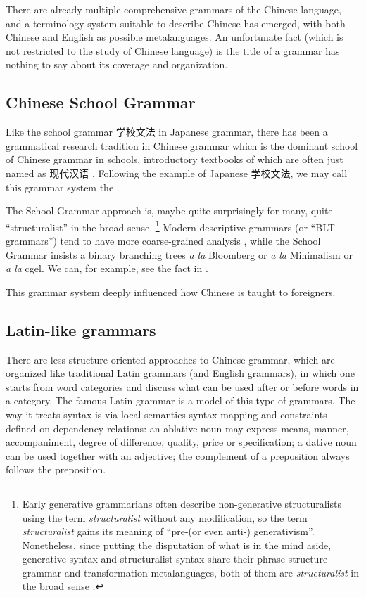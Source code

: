There are already multiple comprehensive grammars of the Chinese language, and a terminology system 
suitable to describe Chinese has emerged, with both Chinese and English as possible metalanguages. 
An unfortunate fact (which is not restricted to the study of Chinese language) is the title of a grammar
has nothing to say about its coverage and organization. 

\subsection{Chinese School Grammar}\label{sec:school-grammar}

Like the school grammar 学校文法 in Japanese grammar, there has been a grammatical research tradition 
in Chinese grammar which is the dominant school of Chinese grammar in schools, introductory textbooks of 
which are often just named as 现代汉语 \citep[e.g.][]{xianhan2004}. Following the example of Japanese 
学校文法, we may call this grammar system the .

The School Grammar approach is, maybe quite surprisingly for many, quite ``structuralist'' in the broad 
sense.%
\footnote{
    Early generative grammarians often describe non-generative structuralists using the term \emph{structuralist}
    without any modification, so the term \emph{structuralist} gains its meaning of ``pre-(or even anti-)
    generativism''. Nonetheless, since putting the disputation of what is in the mind aside, 
    generative syntax and structuralist syntax share their phrase structure grammar and transformation 
    metalanguages, both of them are \emph{structuralist} in the broad sense \citep{newmeyer1986has}.
}
Modern descriptive grammars (or ``BLT grammars'') tend to have more coarse-grained analysis \citep{dryer2006descriptive},
while the School Grammar insists a binary branching trees \emph{a la} Bloomberg or \emph{a la} Minimalism
or \emph{a la} \ac{cgel}. We can, for example, see the fact in .

This grammar system deeply influenced how Chinese is taught to foreigners. %

\subsection{Latin-like grammars}

There are less structure-oriented approaches to Chinese grammar, which are organized like traditional 
Latin grammars (and English grammars), in which one starts from word categories and discuss what can be 
used after or before words in a category. The famous Latin grammar \citet{greenough2013allen} is 
a model of this type of grammars. The way it treats syntax is via local semantics-syntax mapping 
and constraints defined on dependency relations: an ablative noun may express means, manner, 
accompaniment, degree of difference, quality, price or specification; a dative noun can be used 
together with an adjective; the complement of a preposition always follows the preposition.

